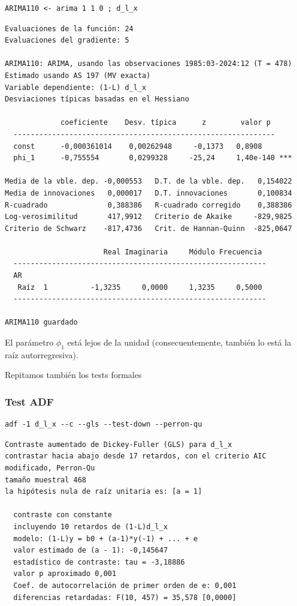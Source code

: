 \documentclass[10pt]{article}
\begin{document}
\begin{verbatim}
ARIMA110 <- arima 1 1 0 ; d_l_x
\end{verbatim}

\begin{verbatim}
Evaluaciones de la función: 24
Evaluaciones del gradiente: 5

ARIMA110: ARIMA, usando las observaciones 1985:03-2024:12 (T = 478)
Estimado usando AS 197 (MV exacta)
Variable dependiente: (1-L) d_l_x
Desviaciones típicas basadas en el Hessiano

             coeficiente    Desv. típica      z        valor p 
  -------------------------------------------------------------
  const      -0,000361014    0,00262948     -0,1373   0,8908   
  phi_1      -0,755554       0,0299328     -25,24     1,40e-140 ***

Media de la vble. dep. -0,000553   D.T. de la vble. dep.   0,154022
Media de innovaciones   0,000017   D.T. innovaciones       0,100834
R-cuadrado              0,388386   R-cuadrado corregido    0,388386
Log-verosimilitud       417,9912   Criterio de Akaike     -829,9825
Criterio de Schwarz    -817,4736   Crit. de Hannan-Quinn  -825,0647

                       Real Imaginaria     Módulo Frecuencia
  -----------------------------------------------------------
  AR
   Raíz  1          -1,3235     0,0000     1,3235     0,5000
  -----------------------------------------------------------

ARIMA110 guardado
\end{verbatim}

El parámetro \(\phi_1\) está lejos de la unidad (consecuentemente,
también lo está la raíz autorregresiva).

Repitamos también los tests formales
\subsubsection*{Test ADF}
\label{sec:org227e375}

\begin{verbatim}
adf -1 d_l_x --c --gls --test-down --perron-qu 
\end{verbatim}

\begin{verbatim}
Contraste aumentado de Dickey-Fuller (GLS) para d_l_x
contrastar hacia abajo desde 17 retardos, con el criterio AIC modificado, Perron-Qu
tamaño muestral 468
la hipótesis nula de raíz unitaria es: [a = 1]

  contraste con constante 
  incluyendo 10 retardos de (1-L)d_l_x
  modelo: (1-L)y = b0 + (a-1)*y(-1) + ... + e
  valor estimado de (a - 1): -0,145647
  estadístico de contraste: tau = -3,18886
  valor p aproximado 0,001
  Coef. de autocorrelación de primer orden de e: 0,001
  diferencias retardadas: F(10, 457) = 35,578 [0,0000]
\end{verbatim}
\end{document}
